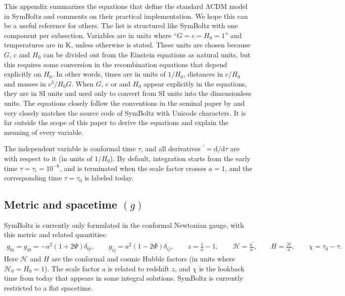 \documentclass{aa}
\newcommand{\LCDM}{$\mathrm{\Lambda C D M}$}
\newcommand\scrH{\mathscr{H}}
\begin{document}
This appendix summarizes the equations that define the standard \LCDM{} model in SymBoltz and comments on their practical implementation.
We hope this can be a useful reference for others.
The list is structured like SymBoltz with one component per subsection.
Variables are in units where \enquote{$G = c = H_0 = 1$} and temperatures are in $\mathrm{K}$, unless otherwise is stated.
These units are chosen because $G$, $c$ and $H_0$ can be divided out from the Einstein equations as natural units, but this requires some conversion in the recombination equations that depend explicitly on $H_0$.
In other words, times are in units of $1/H_0$, distances in $c/H_0$ and masses in $c^3/H_0 G$.
When $G$, $c$ or and $H_0$ appear explicitly in the equations, they are in SI units and used only to convert from SI units into the dimensionless units.
The equations closely follow the conventions in the seminal paper by \cite{maCosmologicalPerturbationTheory1995} and very closely matches the source code of SymBoltz with Unicode characters.
It is far outside the scope of this paper to derive the equations and explain the meaning of every variable.

The independent variable is conformal time $\tau$, and all derivatives ${}^\prime = \mathrm{d} / \mathrm{d}\tau$ are with respect to it (in units of $1/H_0$).
By default, integration starts from the early time $\tau = \tau_i = 10^{-6}$, and is terminated when the scale factor crosses $a = 1$, and the corresponding time $\tau = \tau_0$ is labeled today.

\subsection{Metric and spacetime \texorpdfstring{$(g)$}{(g)}}
\label{sec:metric}
SymBoltz is currently only formulated in the conformal Newtonian gauge, with this metric and related quantities:
\begin{align*}
    g_{0i} = g_{i0} = -a^2 (1+2\Psi) \delta_{0i}, \qquad
    g_{ij} = a^2 (1-2\Phi) \delta_{ij}, \qquad
    z = \frac{1}{a} - 1, \qquad
    \scrH = \frac{a^\prime}{a}, \qquad
    H = \frac{\scrH}{a} , \qquad
    \chi = \tau_0 - \tau .
\end{align*}
Here $\scrH$ and $H$ are the conformal and cosmic Hubble factors (in units where $\scrH_0 = H_0 = 1$).
The scale factor $a$ is related to redshift $z$, and $\chi$ is the lookback time from today that appears in some integral solutions.
SymBoltz is currently restricted to a flat spacetime.
\end{document}
